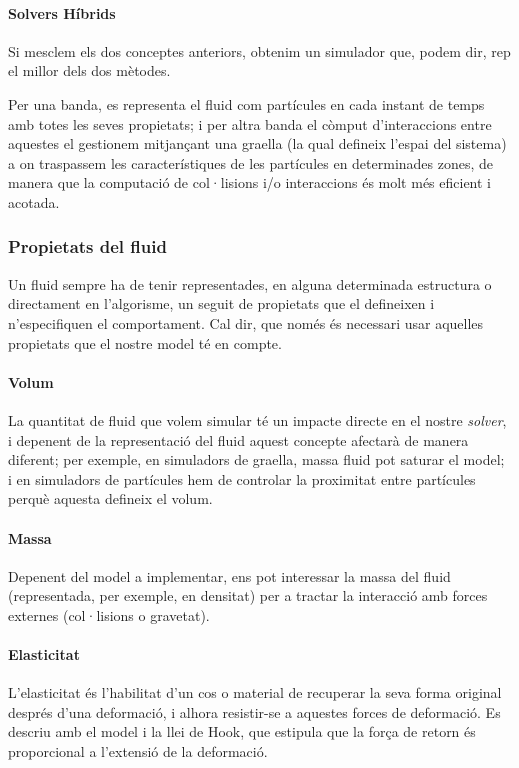 \documentclass[a4paper]{report}
\begin{document}
	\paragraph[Híbrids]{\quad Solvers Híbrids} Si mesclem els dos conceptes anteriors, obtenim un simulador que, podem dir, rep el millor dels dos mètodes.\par
	Per una banda, es representa el fluid com partícules en cada instant de temps amb totes les seves propietats; i per altra banda el còmput d'interaccions entre aquestes el gestionem mitjançant una graella (la qual defineix l'espai del sistema) a on traspassem les característiques de les partícules en determinades zones, de manera que la computació de col·lisions i/o interaccions és molt més eficient i acotada.
	
	\subsubsection{Propietats del fluid} 
	Un fluid sempre ha de tenir representades, en alguna determinada estructura o directament en l'algorisme, un seguit de propietats que el defineixen i n'especifiquen el comportament. Cal dir, que només és necessari usar aquelles propietats que el nostre model té en compte.
	\paragraph{\quad Volum} La quantitat de fluid que volem simular té un impacte directe en el nostre \textit{solver}, i depenent de la representació del fluid aquest concepte afectarà de manera diferent; per exemple, en simuladors de graella, massa fluid pot saturar el model; i en simuladors de partícules hem de controlar la proximitat entre partícules perquè aquesta defineix el volum.
	\paragraph{\quad Massa} Depenent del model a implementar, ens pot interessar la massa del fluid (representada, per exemple, en densitat) per a tractar la interacció amb forces externes (col·lisions o gravetat).
	\paragraph{Elasticitat} L'elasticitat és l'habilitat d'un cos o material de recuperar la seva forma original després d'una deformació, i alhora resistir-se a aquestes forces de deformació. Es descriu amb el model i la llei de Hook, que estipula que la força de retorn és proporcional a l'extensió de la deformació.
\end{document}

